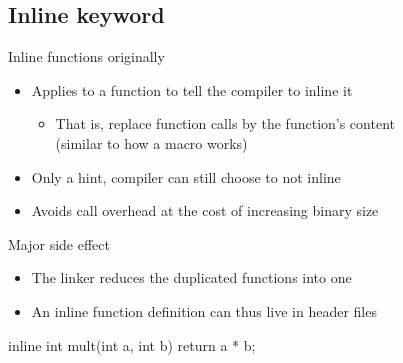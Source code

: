 \subsection[inline]{Inline keyword}

\begin{frame}[fragile]
  \begin{block}{Inline functions originally}
    \begin{itemize}
      \item Applies to a function to tell the compiler to inline it
        \begin{itemize}
        \item That is, replace function calls by the function's content\\
              (similar to how a macro works)
        \end{itemize}
      \item Only a hint, compiler can still choose to not inline
      \item Avoids call overhead at the cost of increasing binary size
    \end{itemize}
  \end{block}
  \begin{exampleblock}{Major side effect}
    \begin{itemize}
      \item The linker reduces the duplicated functions into one
      \item An inline function definition can thus live in header files
    \end{itemize}
  \end{exampleblock}
  \begin{block}{}
    \begin{cppcode*}{}
      inline int mult(int a, int b) {
        return a * b;
      }
    \end{cppcode*}
  \end{block}
\end{frame}

